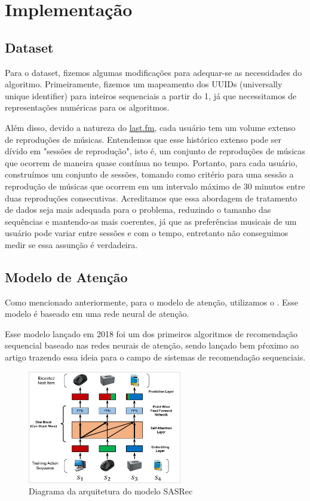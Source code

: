 \section*{Implementação}

\subsection*{Dataset}

Para o dataset, fizemos algumas modificações para adequar-se
as necessidades do algoritmo. Primeiramente, fizemos um
mapeamento dos UUIDs (universally unique identifier) para inteiros
sequenciais a partir do 1, já que necessitamos de representações
numéricas para os algoritmos.

Além disso, devido a natureza do \url{last.fm}, cada usuário tem
um volume extenso de reproduções de músicas. Entendemos que esse
histórico extenso pode ser dívido em "sessões de reprodução", 
isto é, um conjunto de reproduções de músicas que ocorrem de 
maneira quase contínua no tempo. Portanto, para cada usuário,
construímos um conjunto de sessões, tomando como critério para
uma sessão a reprodução de músicas que ocorrem em um intervalo
máximo de 30 minutos entre duas reproduções consecutivas. Acreditamos
que essa abordagem de tratamento de dados seja mais adequada para
o problema, reduzindo o tamanho das sequências e mantendo-as mais
coerentes, já que as preferências musicais de um usuário pode variar
entre sessões e com o tempo, entretanto não conseguimos medir se
essa assunção é verdadeira.

\subsection*{Modelo de Atenção}

Como mencionado anteriormente, para o modelo de atenção, utilizamos
o . Esse modelo é baseado em uma rede neural de
atenção.

Esse modelo lançado em 2018 foi um dos primeiros algoritmos de
recomendação sequencial baseado nas redes neurais de atenção, sendo
lançado bem pŕoximo ao artigo  \cite{attetionisallyouneed}
trazendo essa ideia para o campo de sistemas de recomendação sequenciais.

\begin{figure}[H]
    \centering
    \includegraphics[width=0.6\textwidth]{../assets/sasrec-diagram.png}
    \caption{Diagrama da arquitetura do modelo SASRec \cite{sasrec}}
    \label{fig:sasrec-diagram}
\end{figure}

